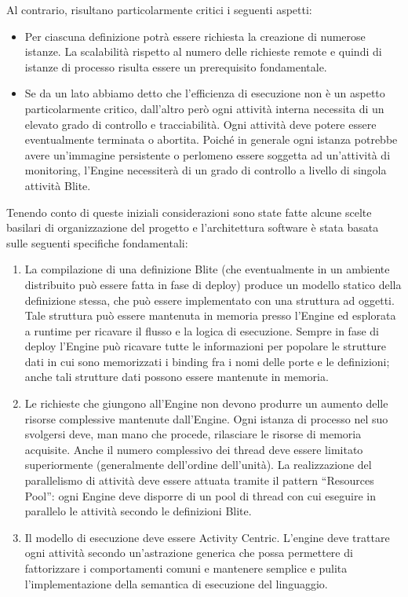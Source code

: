 Al contrario, risultano particolarmente critici i seguenti aspetti:
\begin{itemize}
  \item Per ciascuna definizione potrà essere richiesta la creazione di
  numerose istanze. La scalabilità rispetto al numero delle
  richieste remote e quindi di istanze di processo risulta essere un
  prerequisito fondamentale.
  
  \item Se da un lato abbiamo detto che l'efficienza di esecuzione non \`e 
  un aspetto particolarmente critico, dall'altro per\`o ogni attività interna
  necessita di un elevato grado di controllo e tracciabilità. Ogni attività deve
  potere essere eventualmente terminata o abortita. Poiché in generale
  ogni istanza potrebbe avere un'immagine persistente o
  perlomeno essere soggetta ad un'attività di monitoring, l'Engine necessiterà
  di un grado di controllo a livello di singola attività Blite.
\end{itemize}

Tenendo conto di queste iniziali considerazioni sono state fatte alcune scelte
basilari di organizzazione del progetto e l'architettura software \`e stata
basata sulle seguenti specifiche fondamentali:

\begin{enumerate}
  \item La compilazione di una definizione Blite (che eventualmente in un
  ambiente distribuito può essere fatta in fase di deploy) produce un modello
  statico della definizione stessa, che può essere implementato con
  una struttura ad oggetti. Tale struttura può essere mantenuta in memoria
  presso l'Engine ed esplorata a runtime per ricavare il
  flusso e la logica di esecuzione. Sempre in fase di deploy l'Engine può
  ricavare tutte le informazioni per popolare le strutture dati in cui sono 
  memorizzati i binding fra i nomi delle porte e le definizioni; anche tali
  strutture dati possono essere mantenute in memoria.
  
  \item Le richieste che giungono all'Engine non devono produrre un aumento
  delle risorse complessive mantenute dall'Engine. Ogni istanza di processo nel
  suo svolgersi deve, man mano che procede, rilasciare le risorse di memoria
  acquisite. Anche il numero complessivo dei thread deve essere limitato
  superiormente (generalmente dell'ordine dell'unità). La realizzazione del
  parallelismo di attività deve essere attuata tramite il pattern ``Resources
  Pool'': ogni Engine deve disporre di un pool di thread con cui eseguire in
  parallelo le attività secondo le definizioni Blite.
  
  \item Il modello di esecuzione deve essere Activity Centric. L'engine deve
  trattare ogni attività secondo un'astrazione generica che possa permettere di
  fattorizzare i comportamenti comuni e mantenere semplice e pulita
  l'implementazione della semantica di esecuzione del linguaggio.
\end{enumerate}

